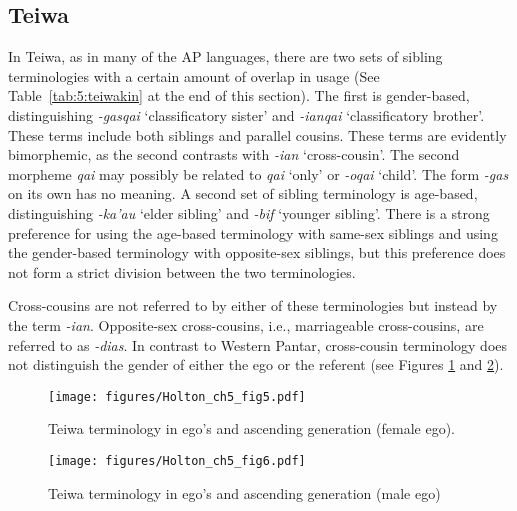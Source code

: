 \subsection{Teiwa}\label{sect_teiwa}
\label{bkm:Ref247777020}In Teiwa, as in many of the AP languages, there are two sets of sibling terminologies with a certain amount of overlap in usage (See Table~\ref{tab:5:teiwakin} at the end of this section). The first is gender-based, distinguishing \textit{-gasqai} `classificatory sister' and \textit{-ianqai} `classificatory brother'. These terms include both siblings and parallel cousins. These terms are evidently bimorphemic, as the second contrasts with \textit{-ian} `cross-cousin'. The second morpheme \textit{qai} may possibly be related to \textit{qai} `only' or \textit{-oqai} `child'. The form \textit{-gas} on its own has no meaning. A second set of sibling terminology is age-based, distinguishing \textit{-ka'au} `elder sibling' and \textit{-bif}  `younger sibling'. There is a strong preference for using the age-based terminology with same-sex siblings and using the gender-based terminology with opposite-sex siblings, but this preference does not form a strict division between the two terminologies. 

Cross-cousins are not referred to by either of these terminologies but instead by the term \textit{-ian}. Opposite-sex cross-cousins, i.e., marriageable cross-cousins, are referred to as  \textit{-dias}. In contrast to Western Pantar, cross-cousin terminology does not distinguish the gender of either the ego or the referent (see Figures \ref{fig:5:5} and \ref{fig:5:6}).

\begin{figure}[h]
\texttt{[image: figures/Holton\_ch5\_fig5.pdf]}
\caption{Teiwa terminology in ego's and ascending generation (female ego). }
\label{fig:5:5}
\end{figure}   

\begin{figure}[b]
\texttt{[image: figures/Holton\_ch5\_fig6.pdf]}
\caption{Teiwa terminology in ego's and ascending generation (male ego) }
\label{fig:5:6}
\end{figure}  
 

